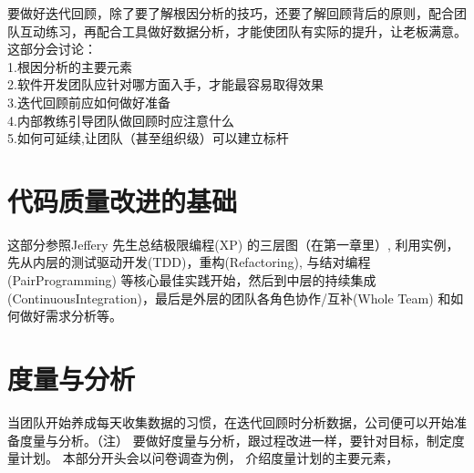 \documentclass{book}        %
\begin{document}
要做好迭代回顾，除了要了解根因分析的技巧，还要了解回顾背后的原则，配合团队互动练习，再配合工具做好数据分析，才能使团队有实际的提升，让老板满意。\\

这部分会讨论： \\

1.根因分析的主要元素\\
2.软件开发团队应针对哪方面入手，才能最容易取得效果\\
3.迭代回顾前应如何做好准备\\
4.内部教练引导团队做回顾时应注意什么\\
5.如何可延续,让团队（甚至组织级）可以建立标杆\\





\part{代码质量改进的基础}这部分参照Jeffery 先生总结极限编程(XP) 的三层图（在第一章里）, 利用实例，先从内层的测试驱动开发(TDD)，重构(Refactoring), 与结对编程(PairProgramming) 等核心最佳实践开始，然后到中层的持续集成(ContinuousIntegration)，最后是外层的团队各角色协作/互补(Whole Team) 和如何做好需求分析等。














\part{度量与分析}当团队开始养成每天收集数据的习惯，在迭代回顾时分析数据，公司便可以开始准备度量与分析。（注） 要做好度量与分析，跟过程改进一样，要针对目标，制定度量计划。 本部分开头会以问卷调查为例， 介绍度量计划的主要元素，
\end{document}
